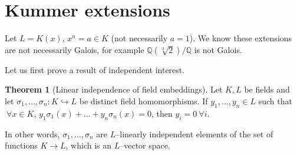 \documentclass{article}
\theoremstyle{definition}
\newtheorem{theorem}{Theorem}[section]
\begin{document}
\section{Kummer extensions}

Let $L=K(x)$, $x^n=a \in K$ (not necessarily $a=1$). We know these extensions are not necessarily Galois, for example $\mathbb{Q}(\sqrt[3]{2})/\mathbb{Q}$ is not Galois.

Let us first prove a result of independent interest.
\begin{theorem}[Linear independence of field embeddings]
    Let $K,L$ be fields and let $\sigma_1,\ldots,\sigma_n : K \hookrightarrow L$ be distinct field homomorphisms. If $y_1,\ldots,y_n \in L$ such that $~\forall x \in K$, $y_1\sigma_1(x) + \ldots + y_n \sigma_n(x)=0$, then $y_i=0 ~\forall i$.

    In other words, $\sigma_1,\ldots,\sigma_n$ are $L$--linearly independent elements of the set of functions $K \to L$, which is an $L$--vector space.
\end{theorem}
\end{document}
